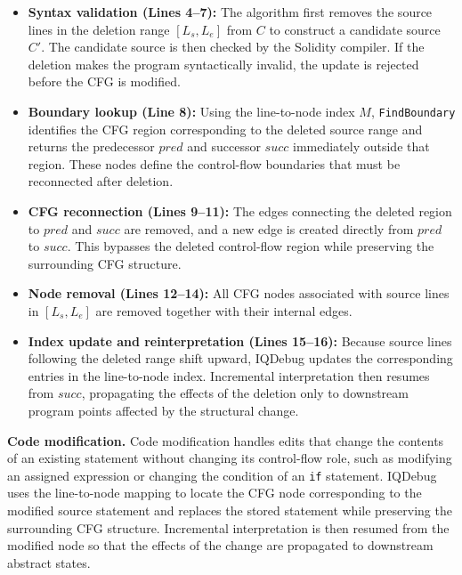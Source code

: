 \documentclass[11pt,oneside]{report}
\theoremstyle{plain}
\theoremstyle{definition}
\theoremstyle{remark}
\begin{document}
\begin{itemize}

    \item \textbf{Syntax validation (Lines 4--7):}
    The algorithm first removes the source lines in the deletion range \([L_s,L_e]\) from \(C\) to construct a candidate source \(C'\).
    The candidate source is then checked by the Solidity compiler.
    If the deletion makes the program syntactically invalid, the update is rejected before the CFG is modified.

    \item \textbf{Boundary lookup (Line 8):}
    Using the line-to-node index \(M\), \texttt{FindBoundary} identifies the CFG region corresponding to the deleted source range and returns the predecessor \(pred\) and successor \(succ\) immediately outside that region.
    These nodes define the control-flow boundaries that must be reconnected after deletion.

    \item \textbf{CFG reconnection (Lines 9--11):}
    The edges connecting the deleted region to \(pred\) and \(succ\) are removed, and a new edge is created directly from \(pred\) to \(succ\).
    This bypasses the deleted control-flow region while preserving the surrounding CFG structure.

    \item \textbf{Node removal (Lines 12--14):}
    All CFG nodes associated with source lines in \([L_s,L_e]\) are removed together with their internal edges.

    \item \textbf{Index update and reinterpretation (Lines 15--16):}
    Because source lines following the deleted range shift upward, IQDebug updates the corresponding entries in the line-to-node index.
    Incremental interpretation then resumes from \(succ\), propagating the effects of the deletion only to downstream program points affected by the structural change.

\end{itemize}

\smallskip
\noindent\textbf{Code modification.}
Code modification handles edits that change the contents of an existing statement without changing its control-flow role, such as modifying an assigned expression or changing the condition of an \texttt{if} statement.
IQDebug uses the line-to-node mapping to locate the CFG node corresponding to the modified source statement and replaces the stored statement while preserving the surrounding CFG structure.
Incremental interpretation is then resumed from the modified node so that the effects of the change are propagated to downstream abstract states.
\end{document}
